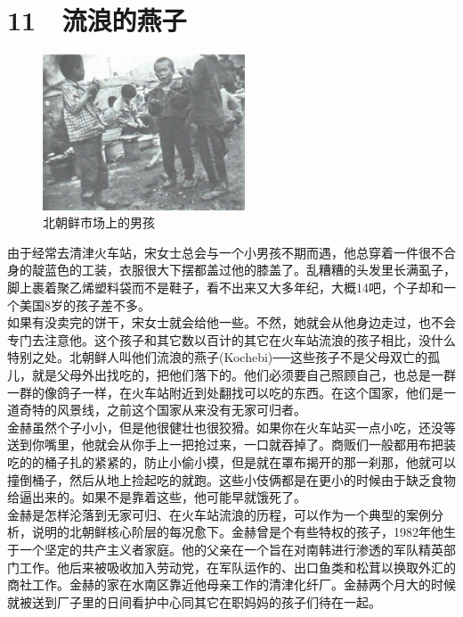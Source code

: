 \fancyhead[RO]{\thepage}
\fancyhead[LE]{\thepage}
\fancyfoot[LE,RO]{}
\fancyfoot[LO,CE]{}
\fancyfoot[CO,RE]{}
\chapter*{11 {\FA } 流浪的燕子}
\begin{figure}[!htbp]
	\centering
	\includegraphics[width=6cm]{./Chapters/Images/11.jpg}
	\caption*{北朝鲜市场上的男孩}
\end{figure}


由于经常去清津火车站，宋女士总会与一个小男孩不期而遇，他总穿着一件很不合身的靛蓝色的工装，衣服很大下摆都盖过他的膝盖了。乱糟糟的头发里长满虱子，脚上裹着聚乙烯塑料袋而不是鞋子，看不出来又大多年纪，大概14吧，个子却和一个美国8岁的孩子差不多。\\

如果有没卖完的饼干，宋女士就会给他一些。不然，她就会从他身边走过，也不会专门去注意他。这个孩子和其它数以百计的其它在火车站流浪的孩子相比，没什么特别之处。北朝鲜人叫他们流浪的燕子(Kochebi)──这些孩子不是父母双亡的孤儿，就是父母外出找吃的，把他们落下的。他们必须要自己照顾自己，也总是一群一群的像鸽子一样，在火车站附近到处翻找可以吃的东西。在这个国家，他们是一道奇特的风景线，之前这个国家从来没有无家可归者。\\

金赫虽然个子小小，但是他很健壮也很狡猾。如果你在火车站买一点小吃，还没等送到你嘴里，他就会从你手上一把抢过来，一口就吞掉了。商贩们一般都用布把装吃的的桶子扎的紧紧的，防止小偷小摸，但是就在罩布揭开的那一刹那，他就可以撞倒桶子，然后从地上捡起吃的就跑。这些小伎俩都是在更小的时候由于缺乏食物给逼出来的。如果不是靠着这些，他可能早就饿死了。\\

金赫是怎样沦落到无家可归、在火车站流浪的历程，可以作为一个典型的案例分析，说明的北朝鲜核心阶层的每况愈下。金赫曾是个有些特权的孩子，1982年他生于一个坚定的共产主义者家庭。他的父亲在一个旨在对南韩进行渗透的军队精英部门工作。他后来被吸收加入劳动党，在军队运作的、出口鱼类和松茸以换取外汇的商社工作。金赫的家在水南区靠近他母亲工作的清津化纤厂。金赫两个月大的时候就被送到厂子里的日间看护中心同其它在职妈妈的孩子们待在一起。\\

